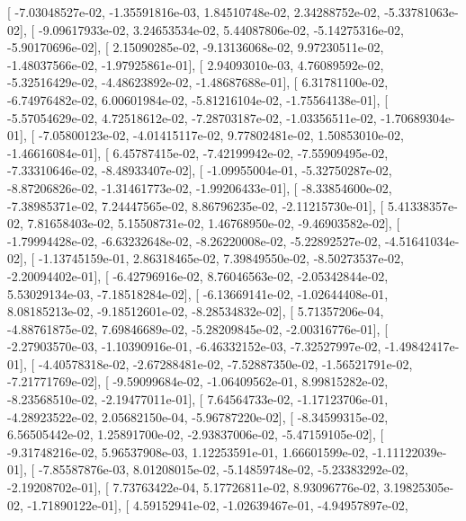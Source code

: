 \documentclass{article}
\begin{document}
       [ -7.03048527e-02,  -1.35591816e-03,   1.84510748e-02,
          2.34288752e-02,  -5.33781063e-02],
       [ -9.09617933e-02,   3.24653534e-02,   5.44087806e-02,
         -5.14275316e-02,  -5.90170696e-02],
       [  2.15090285e-02,  -9.13136068e-02,   9.97230511e-02,
         -1.48037566e-02,  -1.97925861e-01],
       [  2.94093010e-03,   4.76089592e-02,  -5.32516429e-02,
         -4.48623892e-02,  -1.48687688e-01],
       [  6.31781100e-02,  -6.74976482e-02,   6.00601984e-02,
         -5.81216104e-02,  -1.75564138e-01],
       [ -5.57054629e-02,   4.72518612e-02,  -7.28703187e-02,
         -1.03356511e-02,  -1.70689304e-01],
       [ -7.05800123e-02,  -4.01415117e-02,   9.77802481e-02,
          1.50853010e-02,  -1.46616084e-01],
       [  6.45787415e-02,  -7.42199942e-02,  -7.55909495e-02,
         -7.33310646e-02,  -8.48933407e-02],
       [ -1.09955004e-01,  -5.32750287e-02,  -8.87206826e-02,
         -1.31461773e-02,  -1.99206433e-01],
       [ -8.33854600e-02,  -7.38985371e-02,   7.24447565e-02,
          8.86796235e-02,  -2.11215730e-01],
       [  5.41338357e-02,   7.81658403e-02,   5.15508731e-02,
          1.46768950e-02,  -9.46903582e-02],
       [ -1.79994428e-02,  -6.63232648e-02,  -8.26220008e-02,
         -5.22892527e-02,  -4.51641034e-02],
       [ -1.13745159e-01,   2.86318465e-02,   7.39849550e-02,
         -8.50273537e-02,  -2.20094402e-01],
       [ -6.42796916e-02,   8.76046563e-02,  -2.05342844e-02,
          5.53029134e-03,  -7.18518284e-02],
       [ -6.13669141e-02,  -1.02644408e-01,   8.08185213e-02,
         -9.18512601e-02,  -8.28534832e-02],
       [  5.71357206e-04,  -4.88761875e-02,   7.69846689e-02,
         -5.28209845e-02,  -2.00316776e-01],
       [ -2.27903570e-03,  -1.10390916e-01,  -6.46332152e-03,
         -7.32527997e-02,  -1.49842417e-01],
       [ -4.40578318e-02,  -2.67288481e-02,  -7.52887350e-02,
         -1.56521791e-02,  -7.21771769e-02],
       [ -9.59099684e-02,  -1.06409562e-01,   8.99815282e-02,
         -8.23568510e-02,  -2.19477011e-01],
       [  7.64564733e-02,  -1.17123706e-01,  -4.28923522e-02,
          2.05682150e-04,  -5.96787220e-02],
       [ -8.34599315e-02,   6.56505442e-02,   1.25891700e-02,
         -2.93837006e-02,  -5.47159105e-02],
       [ -9.31748216e-02,   5.96537908e-03,   1.12253591e-01,
          1.66601599e-02,  -1.11122039e-01],
       [ -7.85587876e-03,   8.01208015e-02,  -5.14859748e-02,
         -5.23383292e-02,  -2.19208702e-01],
       [  7.73763422e-04,   5.17726811e-02,   8.93096776e-02,
          3.19825305e-02,  -1.71890122e-01],
       [  4.59152941e-02,  -1.02639467e-01,  -4.94957897e-02,
\end{document}

